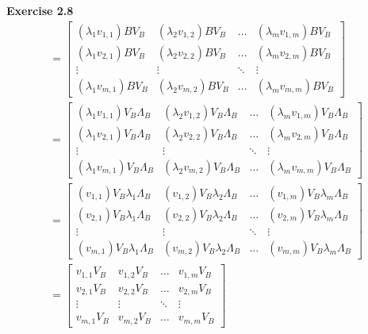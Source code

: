 \documentclass[12pt]{article}
\newenvironment{exercise}[1]{\vspace{.1in}\noindent\textbf{Exercise #1 \hspace{.05em}}}{}
\begin{document}
\begin{exercise}{2.8}
	\begin{align}
		=\begin{bmatrix}
			 (\lambda_1 v_{1,1})BV_B & (\lambda_2 v_{1,2})BV_B & \dots  & (\lambda_m v_{1,m})BV_B \\
			 (\lambda_1 v_{2,1})BV_B & (\lambda_2 v_{2,2})BV_B & \dots  & (\lambda_m v_{2,m})BV_B \\
			 \vdots                  & \vdots                  & \ddots & \vdots                  \\
			 (\lambda_1 v_{m,1})BV_B & (\lambda_2 v_{m,2})BV_B & \dots  & (\lambda_m v_{m,m})BV_B\end{bmatrix}                         \\
		=\begin{bmatrix}
			 (\lambda_1 v_{1,1})V_B\Lambda_B & (\lambda_2 v_{1,2})V_B\Lambda_B & \dots  & (\lambda_m v_{1,m})V_B\Lambda_B \\
			 (\lambda_1 v_{2,1})V_B\Lambda_B & (\lambda_2 v_{2,2})V_B\Lambda_B & \dots  & (\lambda_m v_{2,m})V_B\Lambda_B \\
			 \vdots                          & \vdots                          & \ddots & \vdots                          \\
			 (\lambda_1 v_{m,1})V_B\Lambda_B & (\lambda_2 v_{m,2})V_B\Lambda_B & \dots  & (\lambda_m v_{m,m})V_B\Lambda_B\end{bmatrix} \\
		=\begin{bmatrix}
			 (v_{1,1})V_B\lambda_1 \Lambda_B & (v_{1,2})V_B\lambda_2 \Lambda_B & \dots  & (v_{1,m})V_B\lambda_m \Lambda_B \\
			 (v_{2,1})V_B\lambda_1 \Lambda_B & (v_{2,2})V_B\lambda_2 \Lambda_B & \dots  & (v_{2,m})V_B\lambda_m \Lambda_B \\
			 \vdots                          & \vdots                          & \ddots & \vdots                          \\
			 (v_{m,1})V_B\lambda_1 \Lambda_B & (v_{m,2})V_B\lambda_2 \Lambda_B & \dots  & (v_{m,m})V_B\lambda_m \Lambda_B\end{bmatrix} \\
		=\begin{bmatrix}
			 v_{1,1}V_B & v_{1,2}V_B & \dots  & v_{1,m}V_B \\
			 v_{2,1}V_B & v_{2,2}V_B & \dots  & v_{2,m}V_B \\
			 \vdots     & \vdots     & \ddots & \vdots     \\
			 v_{m,1}V_B & v_{m,2}V_B & \dots  & v_{m,m}V_B
		 \end{bmatrix} %

\end{align}
\end{exercise}
\end{document}
